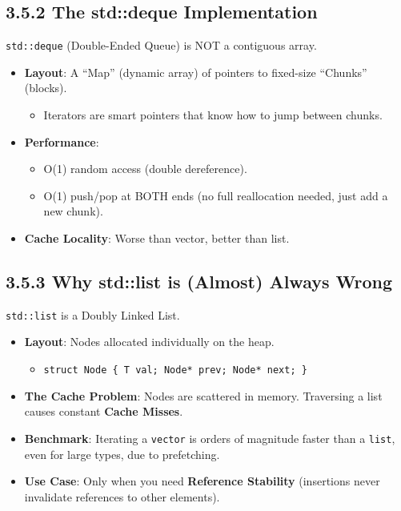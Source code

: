 \hypertarget{the-stddeque-implementation}{%
\subsection{3.5.2 The std::deque
Implementation}\label{the-stddeque-implementation}}

\passthrough{\lstinline!std::deque!} (Double-Ended Queue) is NOT a
contiguous array.

\begin{itemize}
\tightlist
\item
  \textbf{Layout}: A ``Map'' (dynamic array) of pointers to fixed-size
  ``Chunks'' (blocks).

  \begin{itemize}
  \tightlist
  \item
    Iterators are smart pointers that know how to jump between chunks.
  \end{itemize}
\item
  \textbf{Performance}:

  \begin{itemize}
  \tightlist
  \item
    O(1) random access (double dereference).
  \item
    O(1) push/pop at BOTH ends (no full reallocation needed, just add a
    new chunk).
  \end{itemize}
\item
  \textbf{Cache Locality}: Worse than vector, better than list.
\end{itemize}

\hypertarget{why-stdlist-is-almost-always-wrong}{%
\subsection{3.5.3 Why std::list is (Almost) Always
Wrong}\label{why-stdlist-is-almost-always-wrong}}

\passthrough{\lstinline!std::list!} is a Doubly Linked List.

\begin{itemize}
\tightlist
\item
  \textbf{Layout}: Nodes allocated individually on the heap.

  \begin{itemize}
  \tightlist
  \item
    \passthrough{\lstinline!struct Node \{ T val; Node* prev; Node* next; \}!}
  \end{itemize}
\item
  \textbf{The Cache Problem}: Nodes are scattered in memory. Traversing
  a list causes constant \textbf{Cache Misses}.
\item
  \textbf{Benchmark}: Iterating a \passthrough{\lstinline!vector!} is
  orders of magnitude faster than a \passthrough{\lstinline!list!}, even
  for large types, due to prefetching.
\item
  \textbf{Use Case}: Only when you need \textbf{Reference Stability}
  (insertions never invalidate references to other elements).
\end{itemize}

